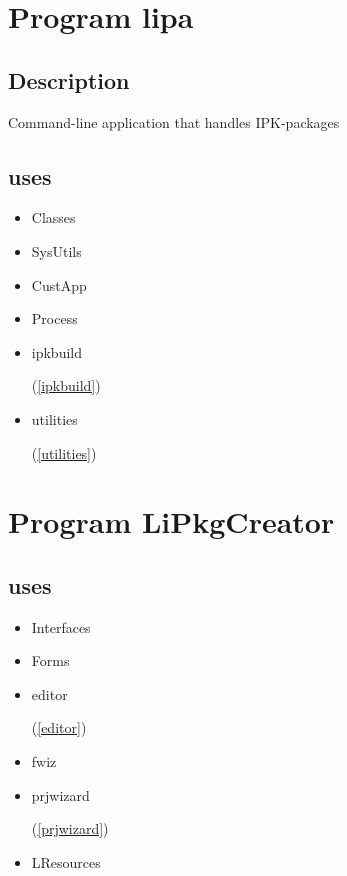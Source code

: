 \documentclass{report}
\begin{document}
\chapter{Program lipa}
\label{lipa}
\section{Description}
Command{-}line application that handles IPK{-}packages
\section{uses}
\begin{itemize}
\item \begin{ttfamily}Classes\end{ttfamily}\item \begin{ttfamily}SysUtils\end{ttfamily}\item \begin{ttfamily}CustApp\end{ttfamily}\item \begin{ttfamily}Process\end{ttfamily}\item \begin{ttfamily}ipkbuild\end{ttfamily}(\ref{ipkbuild})\item \begin{ttfamily}utilities\end{ttfamily}(\ref{utilities})\end{itemize}
\chapter{Program LiPkgCreator}
\label{LiPkgCreator}
\section{uses}
\begin{itemize}
\item \begin{ttfamily}Interfaces\end{ttfamily}\item \begin{ttfamily}Forms\end{ttfamily}\item \begin{ttfamily}editor\end{ttfamily}(\ref{editor})\item \begin{ttfamily}fwiz\end{ttfamily}\item \begin{ttfamily}prjwizard\end{ttfamily}(\ref{prjwizard})\item \begin{ttfamily}LResources\end{ttfamily}\end{itemize}
\end{document}
